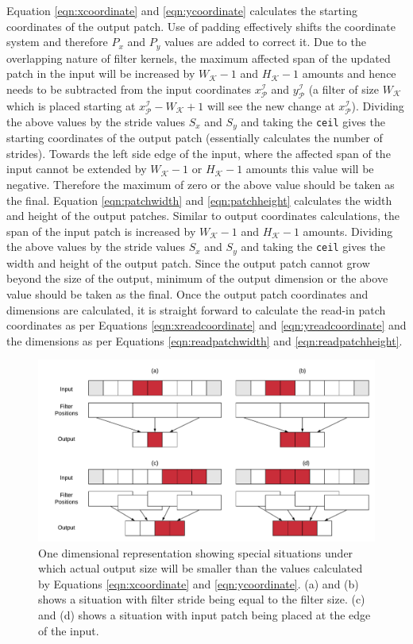 Equation \ref{eqn:xcoordinate} and \ref{eqn:ycoordinate} calculates the starting coordinates of the output patch.
Use of padding effectively shifts the coordinate system and therefore $P_x$ and $P_y$ values are added to correct it.
Due to the overlapping nature of filter kernels, the maximum affected span of the updated patch in the input will be increased by $W_\mathcal{K}-1$ and $H_\mathcal{K}-1$ amounts and hence needs to be subtracted from the input coordinates $x^\mathcal{I}_\mathcal{P}$ and $y^\mathcal{I}_\mathcal{P}$ (a filter of size $W_\mathcal{K}$ which is placed starting at $x^\mathcal{I}_\mathcal{P} - W_\mathcal{K} + 1$ will see the new change at $x^\mathcal{I}_\mathcal{P}$).
Dividing the above values by the stride values $S_x$ and $S_y$ and taking the \texttt{ceil} gives the starting coordinates of the output patch (essentially calculates the number of strides).
Towards the left side edge of the input, where the affected span of the input cannot be extended by $W_\mathcal{K}-1$ or $H_\mathcal{K}-1$ amounts this value will be negative.
Therefore the maximum of zero or the above value should be taken as the final.
Equation \ref{eqn:patchwidth} and \ref{eqn:patchheight} calculates the width and height of the output patches.
Similar to output coordinates calculations, the span of the input patch is increased by $W_\mathcal{K}-1$ and $H_\mathcal{K}-1$ amounts.
Dividing the above values by the stride values $S_x$ and $S_y$ and taking the \texttt{ceil} gives the width and height of the output patch.
Since the output patch cannot grow beyond the size of the output, minimum of the output dimension or the above value should be taken as the final.
Once the output patch coordinates and dimensions are calculated, it is straight forward to calculate the read-in patch coordinates as per Equations \ref{eqn:xreadcoordinate} and \ref{eqn:yreadcoordinate} and the dimensions as per Equations \ref{eqn:readpatchwidth} and \ref{eqn:readpatchheight}.


\begin{figure}[t]
\includegraphics[width=\columnwidth]{images/less_one_example}
\caption{One dimensional representation showing special situations under which actual output size will be smaller than the values calculated by Equations \ref{eqn:xcoordinate} and \ref{eqn:ycoordinate}. (a) and (b) shows a situation with filter stride being equal to the filter size. (c) and (d) shows a situation with input patch being placed at the edge of the input.}
\label{fig:less_one_example}
\end{figure}

